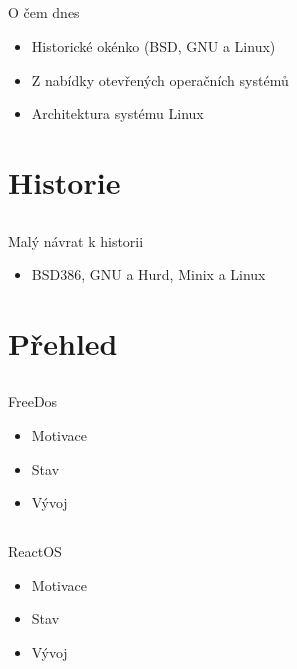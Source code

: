\documentclass{beamer}
\begin{document}
\subsection{}
\begin{frame}{O čem dnes}
\begin{itemize}
\item Historické okénko (BSD, GNU a Linux)
\item Z nabídky otevřených operačních systémů
\item Architektura systému Linux
\end{itemize}
\end{frame}


\section{Historie}

\subsection{}
\begin{frame}{Malý návrat k historii}
\begin{itemize}
\item BSD386, GNU a Hurd, Minix a Linux
\end{itemize}
\end{frame}


\section{Přehled}

\subsection{}
\begin{frame}{FreeDos}
\begin{itemize}
\item Motivace
\item Stav
\item Vývoj
\end{itemize}
\end{frame}

\subsection{}
\begin{frame}{ReactOS}
\begin{itemize}
\item Motivace
\item Stav
\item Vývoj
\end{itemize}
\end{frame}
\end{document}
